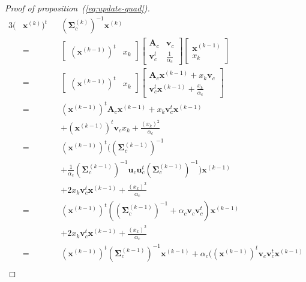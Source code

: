\documentclass[journal]{IEEEtran}
\begin{document}
\begin{proof}[Proof of proposition~(\ref{eq:update-quad})]
    \begin{alignat*}{3}
    (&\mathbf{x}^{(k)})^t && (\boldsymbol{\Sigma}^{(k)}_c)^{-1} \mathbf{x}^{(k)} \\
     &= &&\left[\begin{array}{cc} (\mathbf{x}^{(k-1)})^t   & x_k \end{array}\right]
        \left[\begin{array}{cc}
            \mathbf{A}_c   & \mathbf{v}_c \\
            \mathbf{v}_c^t & \frac{1}{\alpha_c}
        \end{array}\right]
        \left[\begin{array}{c} \mathbf{x}^{(k-1)} \\ x_k \end{array}\right] \\
     &= &&\left[\begin{array}{cc} (\mathbf{x}^{(k-1)})^t   & x_k \end{array}\right]
            \left[\begin{array}{c} \mathbf{A}_c \mathbf{x}^{(k-1)} + x_k \mathbf{v}_c \\ \mathbf{v}_c^t \mathbf{x}^{(k-1)} + \frac{x_k}{\alpha_c} \end{array}\right] \\
     &= &&(\mathbf{x}^{(k-1)})^t \mathbf{A}_c \mathbf{x}^{(k-1)} + x_k \mathbf{v}_c^t \mathbf{x}^{(k-1)} \\
     & &&+ (\mathbf{x}^{(k-1)})^t \mathbf{v}_c x_k + \frac{(x_k)^2}{\alpha_c} \\
     &= &&(\mathbf{x}^{(k-1)})^t ((\boldsymbol{\Sigma}_c^{(k-1)})^{-1} \\
     & &&+ \frac{1}{\alpha_c} (\boldsymbol{\Sigma}_c^{(k-1)})^{-1} \mathbf{u}_c \mathbf{u}_c^t (\boldsymbol{\Sigma}_c^{(k-1)})^{-1}) \mathbf{x}^{(k-1)}\\
     & &&+ 2 x_k \mathbf{v}_c^t \mathbf{x}^{(k-1)} + \frac{(x_k)^2}{\alpha_c} \\
     &= &&(\mathbf{x}^{(k-1)})^t ((\boldsymbol{\Sigma}_c^{(k-1)})^{-1} + \alpha_c \mathbf{v}_c \mathbf{v}_c^t) \mathbf{x}^{(k-1)}\\
     & &&+ 2 x_k \mathbf{v}_c^t \mathbf{x}^{(k-1)} + \frac{(x_k)^2}{\alpha_c} \\
     &= &&(\mathbf{x}^{(k-1)})^t (\boldsymbol{\Sigma}_c^{(k-1)})^{-1} \mathbf{x}^{(k-1)} + \alpha_c ( (\mathbf{x}^{(k-1)})^t \mathbf{v}_c \mathbf{v}_c^t \mathbf{x}^{(k-1)} \\

\end{alignat*}
\end{proof}
\end{document}
